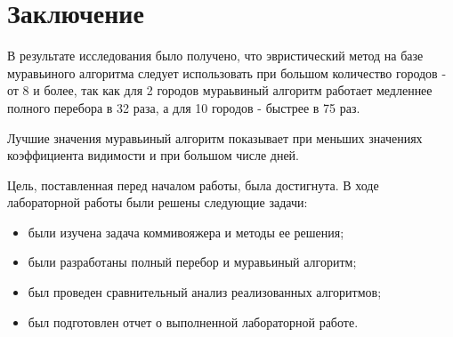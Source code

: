 \chapter*{Заключение}

В результате исследования было получено, что эвристический метод на базе муравьиного алгоритма следует использовать при большом количество городов - от 8 и более, так как для 2 городов мураьвиный алгоритм работает медленнее полного перебора в 32 раза, а для 10 городов - быстрее в 75 раз.

Лучшие значения муравьиный алгоритм показывает при меньших значениях коэффициента видимости и при большом числе дней.

Цель, поставленная перед началом работы, была достигнута. В ходе лабораторной работы были решены следующие задачи:

\begin{itemize}
	\item были изучена задача коммивояжера и методы ее решения;
	\item были разработаны полный перебор и муравьиный алгоритм;
	\item был проведен сравнительный анализ реализованных алгоритмов;
	\item был подготовлен отчет о выполненной лабораторной работе.
\end{itemize}
